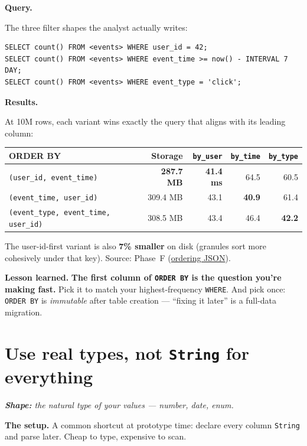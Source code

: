 \documentclass[11pt]{article}
\renewcommand{\arraystretch}{1.15}
\newcommand{\shape}[1]{%
  \par\noindent\textit{\textbf{Shape:} #1}\par\smallskip}
\newcommand{\queryHd}{%
  \par\smallskip\noindent\textbf{\color{accentblue}Query.}\par\nopagebreak\smallskip}
\newcommand{\resultsHd}{%
  \par\smallskip\noindent\textbf{\color{accentblue}Results.}\par\nopagebreak\smallskip}
\newcommand{\lesson}[1]{%
  \par\medskip
  \begin{lessonbox}\textbf{\color{accentgreen}Lesson learned.}\enspace #1\end{lessonbox}}
\begin{document}
\queryHd
The three filter shapes the analyst actually writes:
\begin{lstlisting}
SELECT count() FROM <events> WHERE user_id = 42;
SELECT count() FROM <events> WHERE event_time >= now() - INTERVAL 7 DAY;
SELECT count() FROM <events> WHERE event_type = 'click';
\end{lstlisting}

\resultsHd
At 10M rows, each variant wins exactly the query that aligns with
its leading column:

\renewcommand{\arraystretch}{1.20}
\begin{tabularx}{\linewidth}{@{}X r r r r@{}}
\toprule
\textbf{ORDER BY}                               & \textbf{Storage} & \texttt{by\_user} & \texttt{by\_time} & \texttt{by\_type}\\
\midrule
\rowcolor{accentgreen!12}\texttt{(user\_id, event\_time)} & \textbf{287.7 MB} & \textbf{41.4 ms} & 64.5 & 60.5\\
\texttt{(event\_time, user\_id)}                          & 309.4 MB          & 43.1             & \textbf{40.9}    & 61.4\\
\texttt{(event\_type, event\_time, user\_id)}             & 308.5 MB          & 43.4             & 46.4             & \textbf{42.2}\\
\bottomrule
\end{tabularx}

\smallskip
The user-id-first variant is also \textbf{7\% smaller} on disk (granules
sort more cohesively under that key). Source: Phase~F
(\href{run:results/compare_features_20260503_194824.json}{ordering JSON}).

\lesson{%
\textbf{The first column of \texttt{ORDER BY} is the question you're
making fast.} Pick it to match your highest-frequency \texttt{WHERE}.
And pick once: \texttt{ORDER BY} is \emph{immutable} after table
creation — ``fixing it later'' is a full-data migration.}

\section{Use real types, not \texttt{String} for everything}

\shape{the natural type of your values — number, date, enum.}

\textbf{The setup.}
A common shortcut at prototype time: declare every column \texttt{String}
and parse later. Cheap to type, expensive to scan.
\end{document}
